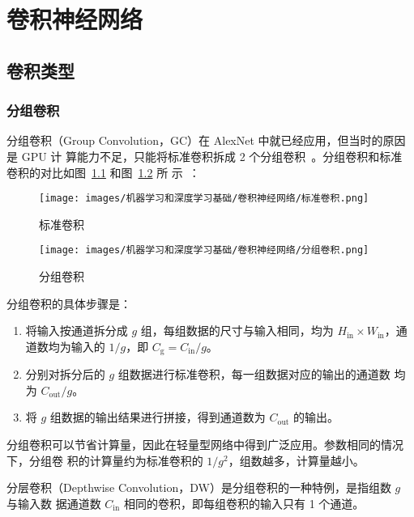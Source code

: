 \chapter{卷积神经网络}

\section{卷积类型}

\subsection{分组卷积}

分组卷积（Group Convolution，GC）在 AlexNet 中就已经应用，但当时的原因是 GPU 计
算能力不足，只能将标准卷积拆成 2 个分组卷积~。分组卷积和标准
卷积的对比如图~\ref{fig:normal-conv} 和图~\ref{fig:group-conv} 所
示~：

\begin{figure}[ht]
  \centering
  \texttt{[image: images/机器学习和深度学习基础/卷积神经网络/标准卷积.png]}
  \caption{标准卷积}\label{fig:normal-conv}
\end{figure}

\begin{figure}[ht]
  \centering
  \texttt{[image: images/机器学习和深度学习基础/卷积神经网络/分组卷积.png]}
  \caption{分组卷积}\label{fig:group-conv}
\end{figure}

分组卷积的具体步骤是：

\begin{enumerate}
  \item 将输入按通道拆分成 $g$ 组，每组数据的尺寸与输入相同，均为 $H_{\mathrm{in}}
    \times W_{\mathrm{in}}$，通道数均为输入的 $ 1/g $，即 $
    C_{\mathrm{g}} = C_{\mathrm{in}} / g $。
  \item 分别对拆分后的 $g$ 组数据进行标准卷积，每一组数据对应的输出的通道数
    均为 $ C_{\mathrm{out}}/g $。
  \item 将 $g$ 组数据的输出结果进行拼接，得到通道数为 $C_{\mathrm{out}}$
    的输出。
\end{enumerate}

分组卷积可以节省计算量，因此在轻量型网络中得到广泛应用。参数相同的情况下，分组卷
积的计算量约为标准卷积的 $ 1 / g^2 $，组数越多，计算量越小。

分层卷积（Depthwise Convolution，DW）是分组卷积的一种特例，是指组数 $g$ 与输入数
据通道数 $C_{\mathrm{in}}$ 相同的卷积，即每组卷积的输入只有 1 个通道。

